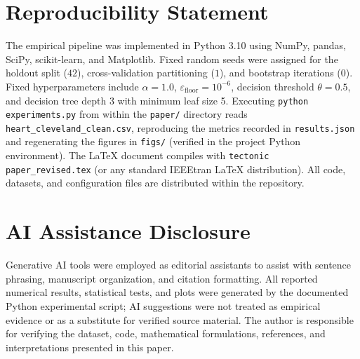 \documentclass[conference]{IEEEtran}
\begin{document}
\section*{Reproducibility Statement}
The empirical pipeline was implemented in Python 3.10 using NumPy, pandas, SciPy, scikit-learn, and Matplotlib. Fixed random seeds were assigned for the holdout split ($42$), cross-validation partitioning ($1$), and bootstrap iterations ($0$). Fixed hyperparameters include $\alpha=1.0$, $\varepsilon_{\mathrm{floor}}=10^{-6}$, decision threshold $\theta=0.5$, and decision tree depth 3 with minimum leaf size 5. Executing \texttt{python experiments.py} from within the \texttt{paper/} directory reads \texttt{heart\_cleveland\_clean.csv}, reproducing the metrics recorded in \texttt{results.json} and regenerating the figures in \texttt{figs/} (verified in the project Python environment). The LaTeX document compiles with \texttt{tectonic paper\_revised.tex} (or any standard IEEEtran LaTeX distribution). All code, datasets, and configuration files are distributed within the repository.

\section*{AI Assistance Disclosure}
Generative AI tools were employed as editorial assistants to assist with sentence phrasing, manuscript organization, and citation formatting. All reported numerical results, statistical tests, and plots were generated by the documented Python experimental script; AI suggestions were not treated as empirical evidence or as a substitute for verified source material. The author is responsible for verifying the dataset, code, mathematical formulations, references, and interpretations presented in this paper.
\end{document}
